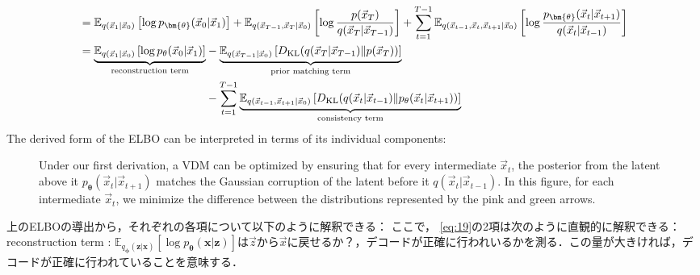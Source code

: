 \begin{align}
&= {\mathbb{E}_{q(\vec{x}_{1}|\vec{x}_0)}\left[\log p_{\bm{\theta}}(\vec{x}_0|\vec{x}_1)\right] + \mathbb{E}_{q(\vec{x}_{T-1}, \vec{x}_T|\vec{x}_0)}\left[\log \frac{p(\vec{x}_T)}{q(\vec{x}_T|\vec{x}_{T-1})}\right] + \sum_{t=1}^{T-1}\mathbb{E}_{q(\vec{x}_{t-1}, \vec{x}_t, \vec{x}_{t+1}|\vec{x}_0)}\left[\log \frac{p_{\bm{\theta}}(\vec{x}_{t}|\vec{x}_{t+1})}{q(\vec{x}_{t}|\vec{x}_{t-1})}\right]}\\
&=  \begin{aligned}[t]
      {\underbrace{\mathbb{E}_{q(\vec{x}_{1}|\vec{x}_0)}\left[\log p_{\theta}(\vec{x}_0|\vec{x}_1)\right]}_\text{reconstruction term}} &- {\underbrace{\mathbb{E}_{q(\vec{x}_{T-1}|\vec{x}_0)}\left[D_{\rm{KL}}{(q(\vec{x}_T|\vec{x}_{T-1})}\|{p(\vec{x}_T))}\right]}_\text{prior matching term}} \\
      &- {\sum_{t=1}^{T-1}\underbrace{\mathbb{E}_{q(\vec{x}_{t-1}, \vec{x}_{t+1}|\vec{x}_0)}\left[D_{\rm{KL}}{(q(\vec{x}_{t}|\vec{x}_{t-1})}\|{p_{\theta}(\vec{x}_{t}|\vec{x}_{t+1}))}\right]}_\text{consistency term}}
    \end{aligned} \label{eq:45}
\end{align}
\endgroup
The derived form of the ELBO can be interpreted in terms of its individual components:

\begin{figure}
  \centering
  \caption{Under our first derivation, a VDM can be optimized by ensuring that for every intermediate $\vec{x}_t$, the posterior from the latent above it $p_{\bm{\theta}}(\vec{x}_t|\vec{x}_{t+1})$ matches the Gaussian corruption of the latent before it $q(\vec{x}_t|\vec{x}_{t-1})$.  In this figure, for each intermediate $\vec{x}_t$, we minimize the difference between the distributions represented by the pink and green arrows.}
  \label{fig:first_deriv}
\end{figure}

上のELBOの導出から，それぞれの各項について以下のように解釈できる：
ここで， \eqref{eq:19}の2項は次のように直観的に解釈できる：reconstruction term : $\mathbb{E}_{q_{\bm{\phi}}(\bm{z}|\bm{x})}\left[\log p_{\bm{\theta}}(\bm{x}|\bm{z})\right]$は$\Vec{z}$から$\Vec{x}$に戻せるか？，デコードが正確に行われいるかを測る．この量が大きければ，デコードが正確に行われていることを意味する．


